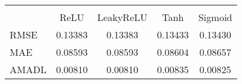 \begin{tabular}{lcccc}
\hline\hline \\ [-1.8ex]
 & ReLU & LeakyReLU & Tanh & Sigmoid \\ 
 \hline 
RMSE & 0.13383 & 0.13383 & 0.13433 & 0.13430 \\ 
MAE & 0.08593 & 0.08593 & 0.08604 & 0.08657 \\ 
AMADL & 0.00810 & 0.00810 & 0.00835 & 0.00825 \\ 
\hline\hline
\end{tabular}